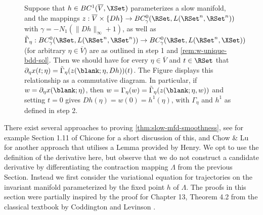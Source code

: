 \documentclass[a4paper]{siamart190516}
\begin{document}
 \begin{figure}\label{fig:com-dia-slow-mfd-var}\centering
{}
\caption{Suppose that $h \in BC^1(\overline{V}, \XSet)$ parameterizes a slow
manifold, and the mappings $z  : \overline{V} \times \{ Dh \} \rightarrow
BC_{\gamma}^0 (\RSet, L(\RSet^n, \RSet^n))$ with $\gamma = -N_1(\| Dh \|_{\infty} +
1)$, as well as $\tilde{\Gamma}_{\eta}: BC_{\gamma}^0 (\RSet, L(\RSet^n, \RSet^n))
\rightarrow BC_{\gamma}^0(\RSet,L(\RSet^n,\XSet)) $ (for arbitrary $\eta \in
\overline{V}$) are as outlined in step 1 and \cref{rem:w-unique-bdd-sol}. Then we should have for every $\eta \in \overline{V}$ and $t \in \RSet$ that $\partial_{\eta} x(t;\eta) = \tilde{\Gamma}_{\eta}(z(\blank; \eta, Dh))(t)$. The Figure displays this relationship as a commutative diagram. In particular, if $w=\partial_{\eta}x(\blank;\eta)$, then  $w = \Gamma_{\eta}(w) = \tilde{\Gamma}_{\eta}(z(\blank;\eta,w))$ and setting $t=0$ gives $Dh(\eta) = w(0) = h^1(\eta) $, with $\Gamma_{\eta}$ and $h^1$ as defined in step 2.}
\end{figure}
 
 \begin{remark}\label{rem:proof-smoothness-variational}
 There exist several approaches to proving \cref{thm:slow-mfd-smoothness}, see for example Section 1.11 of Chicone \cite{Ch06} for a short discussion of this, and Chow \& Lu \cite{ChLu88a} for another approach that utilises a Lemma provided by Henry. We opt to use the definition of the derivative here, but observe that we do not construct a candidate derivative by differentiating the contraction mapping $\Lambda$ from the previous Section. Instead we first consider the variational equation for trajectories on the invariant manifold parameterized by the fixed point $h$ of $\Lambda$. The proofs in this section were partially inspired by the proof for Chapter 13, Theorem 4.2 from the classical textbook by Coddington and Levinson \cite{CoLe55}.
  \end{remark}
\end{document}
